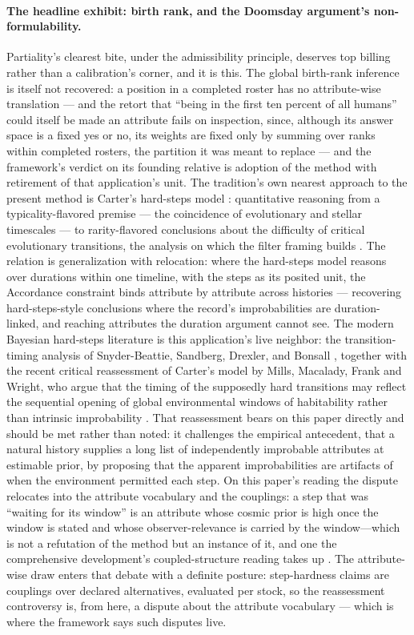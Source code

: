 \paragraph{The headline exhibit: birth rank, and the Doomsday argument's non-formulability.} Partiality's clearest bite, under the admissibility principle, deserves top billing rather than a calibration's corner, and it is this. The global birth-rank inference is itself not recovered: a position in a completed roster has no attribute-wise translation --- and the retort that ``being in the first ten percent of all humans'' could itself be made an attribute fails on inspection, since, although its answer space is a fixed yes or no, its weights are fixed only by summing over ranks within completed rosters, the partition it was meant to replace --- and the framework's verdict on its founding relative is adoption of the method with retirement of that application's unit. The tradition's own nearest approach to the present method is Carter's hard-steps model \cite{carter1983anthropic}: quantitative reasoning from a typicality-flavored premise --- the coincidence of evolutionary and stellar timescales --- to rarity-flavored conclusions about the difficulty of critical evolutionary transitions, the analysis on which the filter framing builds \cite{hanson1998greatfilter}. The relation is generalization with relocation: where the hard-steps model reasons over durations within one timeline, with the steps as its posited unit, the Accordance constraint binds attribute by attribute across histories --- recovering hard-steps-style conclusions where the record's improbabilities are duration-linked, and reaching attributes the duration argument cannot see. The modern Bayesian hard-steps literature is this application's live neighbor: the transition-timing analysis of Snyder-Beattie, Sandberg, Drexler, and Bonsall \cite{snyderbeattie2021timing}, together with the recent critical reassessment of Carter's model by Mills, Macalady, Frank and Wright, who argue that the timing of the supposedly hard transitions may reflect the sequential opening of global environmental windows of habitability rather than intrinsic improbability \cite{mills2025hardsteps}. That reassessment bears on this paper directly and should be met rather than noted: it challenges the empirical antecedent, that a natural history supplies a long list of independently improbable attributes at estimable prior, by proposing that the apparent improbabilities are artifacts of when the environment permitted each step. On this paper's reading the dispute relocates into the attribute vocabulary and the couplings: a step that was ``waiting for its window'' is an attribute whose cosmic prior is high once the window is stated and whose observer-relevance is carried by the window---which is not a refutation of the method but an instance of it, and one the comprehensive development's coupled-structure reading takes up \cite{Nexus}. The attribute-wise draw enters that debate with a definite posture: step-hardness claims are couplings over declared alternatives, evaluated per stock, so the reassessment controversy is, from here, a dispute about the attribute vocabulary --- which is where the framework says such disputes live.

